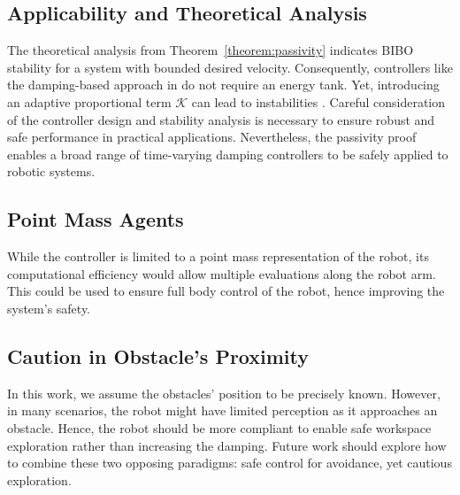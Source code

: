 \subsection{Applicability and Theoretical Analysis}
The theoretical analysis from Theorem~\ref{theorem:passivity} indicates BIBO stability for a system with bounded desired velocity. Consequently, controllers like the damping-based approach in \parencite{kronander2015passive} do not require an energy tank. Yet, introducing an adaptive proportional term $\mathcal{K}$ can lead to instabilities \parencite{ferraguti2013tank, kronander2016stability}. 
Careful consideration of the controller design and stability analysis is necessary to ensure robust and safe performance in practical applications. 
Nevertheless, the passivity proof enables a broad range of time-varying damping controllers to be safely applied to robotic systems.

\iflong
\subsection{Point Mass Agents}
While the controller is limited to a point mass representation of the robot, its computational efficiency would allow multiple evaluations along the robot arm. This could be used to ensure full body control of the robot, hence improving the system's safety.
\fi

\subsection{Caution in Obstacle's Proximity}
In this work, we assume the obstacles' position to be precisely known. However, in many scenarios, the robot might have limited perception as it approaches an obstacle. Hence, the robot should be more compliant to enable safe workspace exploration rather than increasing the damping. Future work should explore how to combine these two opposing paradigms: safe control for avoidance, yet cautious exploration.
